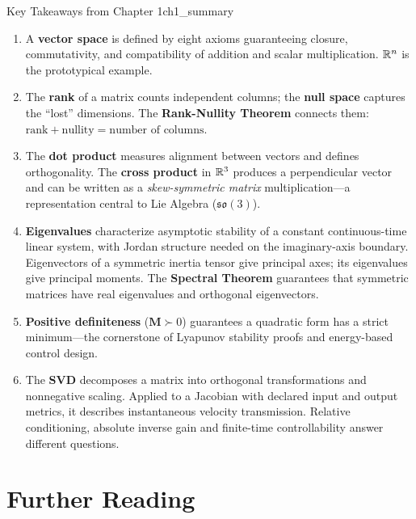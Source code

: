 \begin{principle}{Key Takeaways from Chapter 1}{ch1_summary}
\begin{enumerate}
    \item A \textbf{vector space} is defined by eight axioms guaranteeing closure, commutativity, and compatibility of addition and scalar multiplication. $\mathbb{R}^n$ is the prototypical example.

    \item The \textbf{rank} of a matrix counts independent columns; the \textbf{null space} captures the ``lost'' dimensions. The \textbf{Rank-Nullity Theorem} connects them: $\text{rank} + \text{nullity} = \text{number of columns}$.

    \item The \textbf{dot product} measures alignment between vectors and defines orthogonality. The \textbf{cross product} in $\mathbb{R}^3$ produces a perpendicular vector and can be written as a \emph{skew-symmetric matrix} multiplication---a representation central to Lie Algebra ($\mathfrak{so}(3)$).

    \item \textbf{Eigenvalues} characterize asymptotic stability of a constant continuous-time linear system, with Jordan structure needed on the imaginary-axis boundary. Eigenvectors of a symmetric inertia tensor give principal axes; its eigenvalues give principal moments. The \textbf{Spectral Theorem} guarantees that symmetric matrices have real eigenvalues and orthogonal eigenvectors.

    \item \textbf{Positive definiteness} ($\mathbf{M} \succ 0$) guarantees a quadratic form has a strict minimum---the cornerstone of Lyapunov stability proofs and energy-based control design.

    \item The \textbf{SVD} decomposes a matrix into orthogonal transformations and nonnegative scaling. Applied to a Jacobian with declared input and output metrics, it describes instantaneous velocity transmission. Relative conditioning, absolute inverse gain and finite-time controllability answer different questions.
\end{enumerate}
\end{principle}

\section{Further Reading}
\label{sec:ch1_further_reading}

